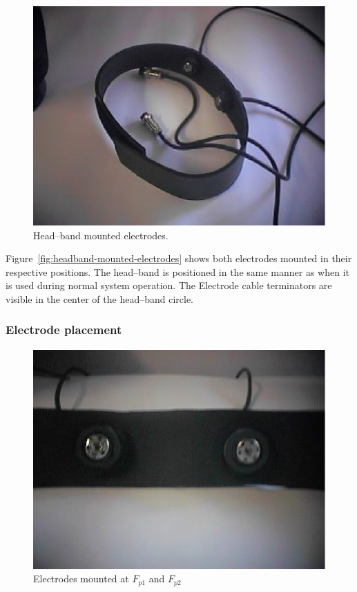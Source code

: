 \begin{center}
\begin{figure}[htbp]
	\begin{center}
	\includegraphics{electrode-headband.ps}
	\caption{Head--band mounted electrodes.}
	\label{fig:headband-mounted-electrodes}
	\end{center}
\end{figure}
\end{center}

Figure~\vref{fig:headband-mounted-electrodes} shows both electrodes
mounted in their respective positions. The head--band is positioned in
the same manner as when it is used during normal system operation. The
Electrode cable terminators are visible in the center of the
head--band circle.


\subsubsection{Electrode placement}
\begin{figure}[htbp]
\begin{center}
	\includegraphics*{electrodes-front-headband.ps}
	\caption{Electrodes mounted at $F_{p1}$ and $F_{p2}$}
\label{fig:mount1}
\end{center}
\end{figure}

